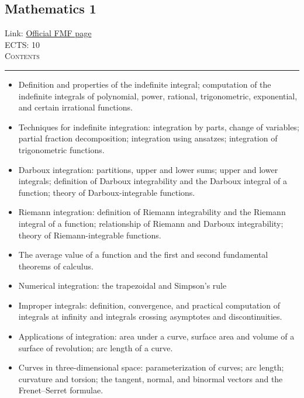 \documentclass[11pt, a4paper]{article}
\newenvironment{course}[3]{
\subsection{#1}%
Link: \href{#2}{Official FMF page}\\%
ECTS: #3%
\vspace{1ex}
\\
{\large \textsc{Contents}}\\[-0.9ex]%
\rule{\textwidth}{0.5pt}
\vspace{-3ex}
}
{}
\newenvironment{chapter}[1]{
\begin{tcolorbox}[title=#1, breakable]
}
{\end{tcolorbox}}
\begin{document}
\begin{course}{Mathematics 1}{https://www.fmf.uni-lj.si/en/study-physics/programmes/1fiz/2020/7000777/courses/520/}{10}
    \begin{chapter}{Integral calculus}
        \begin{itemize}
            \item Definition and properties of the indefinite integral; computation of the indefinite integrals of polynomial, power, rational, trigonometric, exponential, and certain irrational functions.

            \item Techniques for indefinite integration: integration by parts, change of variables; partial fraction decomposition; integration using ansatzes; integration of trigonometric functions.

            \item Darboux integration: partitions, upper and lower sums; upper and lower integrals; definition of Darboux integrability and the Darboux integral of a function; theory of Darboux-integrable functions.

            \item Riemann integration: definition of Riemann integrability and the Riemann integral of a function; relationship of Riemann and Darboux integrability; theory of Riemann-integrable functions.

            \item The average value of a function and the first and second fundamental theorems of calculus.

            \item Numerical integration: the trapezoidal and Simpson's rule

            \item Improper integrals: definition, convergence, and practical computation of integrals at infinity and integrals crossing asymptotes and discontinuities.

            \item Applications of integration: area under a curve, surface area and volume of a surface of revolution; arc length of a curve.

            \item Curves in three-dimensional space: parameterization of curves; arc length; curvature and torsion; the tangent, normal, and binormal vectors and the Frenet–Serret formulae.

        \end{itemize}
    \end{chapter}

    \begin{chapter}{Taylor and power series}
        \begin{itemize}
        

\end{itemize}
\end{chapter}
\end{course}
\end{document}
